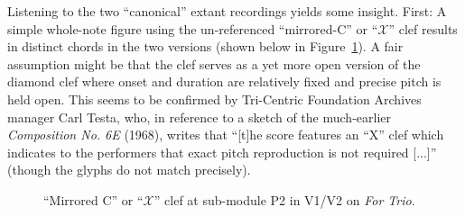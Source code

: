         Listening to the two ``canonical'' extant recordings yields some insight. First: A simple whole-note figure using the un-referenced ``mirrored-C'' or ``$\mathscr{X}$'' clef results in distinct chords in the two versions (shown below in Figure~\ref{fig:mysteryclef}). A fair assumption might be that the clef serves as a yet more open version of the diamond clef where onset and duration are relatively fixed and precise pitch is held open. This seems to be confirmed by Tri-Centric Foundation Archives manager Carl Testa, who, in reference to a sketch of the much-earlier \textit{Composition No. 6E} (1968), writes that ``[t]he score features an ``X'' clef which indicates to the performers that exact pitch reproduction is not required [...]'' (though the glyphs do not match precisely).\autocite{Testa}

            \begin{figure}
                \centering
                \qquad
                \captionsetup{width=.55\textwidth}
                \caption[``Mirrored C'' or ``$\mathscr{X}$'' clef at sub-module P2 in V1/V2 on \textit{For Trio}.]{``Mirrored C'' or ``$\mathscr{X}$'' clef at sub-module P2 in V1/V2 on \textit{For Trio}.\footnotemark}%
                \label{fig:mysteryclef}%
            \end{figure}

